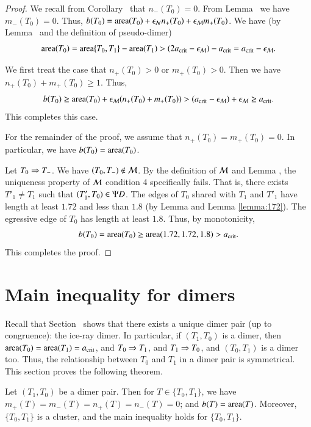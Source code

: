 \begin{proof}
  We recall from Corollary~ that $n_-(T_0)=0$.  From
  Lemma~ we have $m_-(T_0)=0$.  Thus, $b(T_0) =
  {\operatorname{area}}(T_0) + \epsilon_{\mathcal N} n_+(T_0) + \epsilon_{\mathcal M} m_+(T_0)$.  We have
  (by Lemma~ and the definition of pseudo-dimer)
\[
{\operatorname{area}}(T_0) = {\operatorname{area}}\{T_0,T_1\} - {\operatorname{area}}(T_1) 
> (2a_\text{crit}-\epsilon_{\mathcal M}) -a_\text{crit} = a_\text{crit} - \epsilon_{\mathcal M}.
\]

We first treat the case that $n_+(T_0)>0$ or $m_+(T_0)>0$.  Then we
have $n_+(T_0)+m_+(T_0)\ge 1$.  Thus,
\[
b(T_0) \ge {\operatorname{area}}(T_0) + \epsilon_{\mathcal M} (n_+(T_0)+m_+(T_0)) > (a_\text{crit} - \epsilon_{\mathcal M})
+ \epsilon_{\mathcal M} \ge a_\text{crit}.
\]
This completes this case.

For the remainder of the proof, we assume that $n_+(T_0)=m_+(T_0)=0$.  In
particular, we have $b(T_0) = {\operatorname{area}}(T_0)$.

Let $T_0\Rightarrow T_-$.  We have $(T_0,T_-)\not\in\mathcal M$.  By the definition of $\mathcal M$ and Lemma , 
the uniqueness property of $\mathcal M$ condition 4 specifically fails.  That is,
there exists $T'_1\ne T_1$ such that $(T'_1,T_0)\in\Psi D$.  The edges of
$T_0$ shared with $T_1$ and $T'_1$ have length at least $1.72$ and
less than $1.8$ (by Lemma  and Lemma \ref{lemma:172}).  The egressive edge of $T_0$ has length at least
$1.8$.  Thus, by monotonicity,
\[
b(T_0) = {\operatorname{area}} (T_0) \ge {\operatorname{area}}(1.72,1.72,1.8) > a_\text{crit}.
\]
This completes the proof.
\end{proof}

\section{Main inequality for dimers}

Recall that Section~ shows that there exists a unique
dimer pair (up to congruence): the ice-ray dimer.  In particular, if
$(T_1,T_0)$ is a dimer, then ${\operatorname{area}}(T_0)={\operatorname{area}}(T_1)=a_\text{crit}$, and
$T_0\Rightarrow T_1$, and $T_1\Rightarrow T_0$, and $(T_0,T_1)$ is a dimer too.  Thus,
the relationship between $T_0$ and $T_1$ in a dimer pair is
symmetrical.  This section proves the following theorem.

\begin{theorem} 
  Let $(T_1,T_0)$ be a dimer pair.  Then for $T\in\{T_0,T_1\}$, we have
  $m_+(T)=m_-(T) = n_+(T)=n_-(T) = 0$; and $b(T) = {\operatorname{area}}(T)$.
  Moreover, $\{T_0,T_1\}$ is a cluster, and the main inequality holds
  for $\{T_0,T_1\}$.
\end{theorem}

